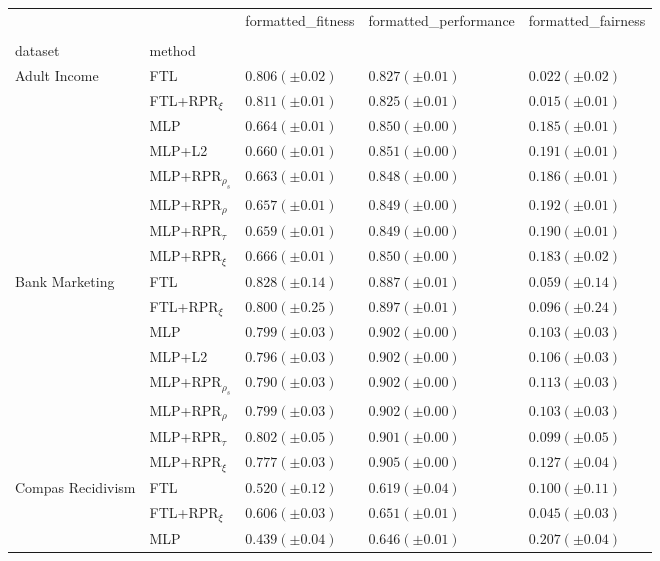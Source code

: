 \begin{tabular}{lllll}
\toprule
 &  & formatted_fitness & formatted_performance & formatted_fairness \\
 &  &  &  &  \\
dataset & method &  &  &  \\
\midrule
\multirow[t]{8}{*}{Adult Income} & FTL & $0.806 (\pm0.02)$ & $0.827 (\pm0.01)$ & $0.022 (\pm0.02)$ \\
 & FTL+RPR$_{\xi}$ & $0.811 (\pm0.01)$ & $0.825 (\pm0.01)$ & $0.015 (\pm0.01)$ \\
 & MLP & $0.664 (\pm0.01)$ & $0.850 (\pm0.00)$ & $0.185 (\pm0.01)$ \\
 & MLP+L2 & $0.660 (\pm0.01)$ & $0.851 (\pm0.00)$ & $0.191 (\pm0.01)$ \\
 & MLP+RPR$_{\rho_s}$ & $0.663 (\pm0.01)$ & $0.848 (\pm0.00)$ & $0.186 (\pm0.01)$ \\
 & MLP+RPR$_{\rho}$ & $0.657 (\pm0.01)$ & $0.849 (\pm0.00)$ & $0.192 (\pm0.01)$ \\
 & MLP+RPR$_{\tau}$ & $0.659 (\pm0.01)$ & $0.849 (\pm0.00)$ & $0.190 (\pm0.01)$ \\
 & MLP+RPR$_{\xi}$ & $0.666 (\pm0.01)$ & $0.850 (\pm0.00)$ & $0.183 (\pm0.02)$ \\
\cline{1-5}
\multirow[t]{8}{*}{Bank Marketing} & FTL & $0.828 (\pm0.14)$ & $0.887 (\pm0.01)$ & $0.059 (\pm0.14)$ \\
 & FTL+RPR$_{\xi}$ & $0.800 (\pm0.25)$ & $0.897 (\pm0.01)$ & $0.096 (\pm0.24)$ \\
 & MLP & $0.799 (\pm0.03)$ & $0.902 (\pm0.00)$ & $0.103 (\pm0.03)$ \\
 & MLP+L2 & $0.796 (\pm0.03)$ & $0.902 (\pm0.00)$ & $0.106 (\pm0.03)$ \\
 & MLP+RPR$_{\rho_s}$ & $0.790 (\pm0.03)$ & $0.902 (\pm0.00)$ & $0.113 (\pm0.03)$ \\
 & MLP+RPR$_{\rho}$ & $0.799 (\pm0.03)$ & $0.902 (\pm0.00)$ & $0.103 (\pm0.03)$ \\
 & MLP+RPR$_{\tau}$ & $0.802 (\pm0.05)$ & $0.901 (\pm0.00)$ & $0.099 (\pm0.05)$ \\
 & MLP+RPR$_{\xi}$ & $0.777 (\pm0.03)$ & $0.905 (\pm0.00)$ & $0.127 (\pm0.04)$ \\
\cline{1-5}
\multirow[t]{8}{*}{Compas Recidivism} & FTL & $0.520 (\pm0.12)$ & $0.619 (\pm0.04)$ & $0.100 (\pm0.11)$ \\
 & FTL+RPR$_{\xi}$ & $0.606 (\pm0.03)$ & $0.651 (\pm0.01)$ & $0.045 (\pm0.03)$ \\
 & MLP & $0.439 (\pm0.04)$ & $0.646 (\pm0.01)$ & $0.207 (\pm0.04)$ \\

\end{tabular}
